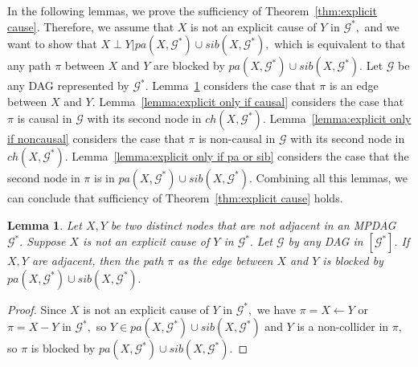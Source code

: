 \documentclass{article}
\newtheorem{lemma}{Lemma}
\begin{document}
In the following lemmas, we prove the sufficiency of Theorem~\ref{thm:explicit cause}. Therefore, we assume that $X$ is not an explicit cause of $Y$ in $\mathcal{G}^*,$ and we want to show that $X \perp Y|pa(X,\mathcal{G}^*)\cup sib(X,\mathcal{G}^*),$ which is equivalent to that any path $\pi$ between $X$ and $Y$ are blocked by $pa(X,\mathcal{G}^*)\cup sib(X,\mathcal{G}^*).$ Let $\mathcal{G}$ be any DAG represented by $\mathcal{G}^*.$
Lemma~\ref{lemma:explicit only if adjacent} considers the case that $\pi$ is an edge between $X$ and $Y.$ Lemma~\ref{lemma:explicit only if causal} considers the case that $\pi$ is causal in $\mathcal{G}$ with its second node in $ch(X,\mathcal{G}^*).$ Lemma~\ref{lemma:explicit only if noncausal} considers the case that $\pi$ is non-causal in $\mathcal{G}$ with its second node in $ch(X,\mathcal{G}^*).$ Lemma~\ref{lemma:explicit only if pa or sib} considers the case that the second node in $\pi$ is in $pa(X,\mathcal{G}^*)\cup sib(X,\mathcal{G}^*).$ Combining all this lemmas, we can conclude that sufficiency of Theorem~\ref{thm:explicit cause} holds.

\begin{lemma}
\label{lemma:explicit only if adjacent}
Let $X,Y$ be two distinct nodes that are not adjacent in an MPDAG $\mathcal{G}^*.$ Suppose $X$ is not an explicit cause of $Y$ in $\mathcal{G}^*.$ Let $\mathcal{G}$ by any DAG in $[\mathcal{G}^*].$ If $X,Y$ are adjacent, then the path $\pi$ as the edge between $X$ and $Y$ is blocked by $pa(X,\mathcal{G}^*)\cup sib(X,\mathcal{G}^*).$
\end{lemma}
\begin{proof}
Since $X$ is not an explicit cause of $Y$ in $\mathcal{G}^*,$ we have $\pi=X\leftarrow Y$ or $\pi=X-Y$ in $\mathcal{G}^*,$ so $Y\in pa(X,\mathcal{G}^*)\cup sib(X,\mathcal{G}^*)$ and $Y$ is a non-collider in $\pi,$ so $\pi$ is blocked by $pa(X,\mathcal{G}^*)\cup sib(X,\mathcal{G}^*).$ 
\end{proof}
\end{document}
